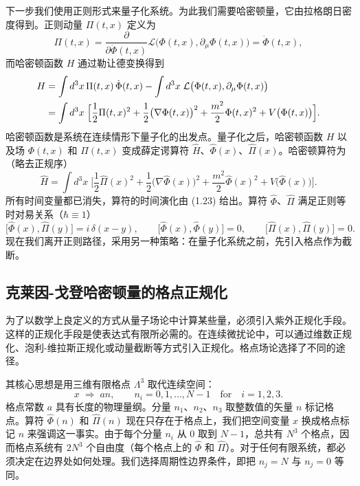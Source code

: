 下一步我们使用正则形式来量子化系统。为此我们需要哈密顿量，它由拉格朗日密度得到。正则动量 $\Pi(t,x)$ 定义为
\begin{equation}
  \Pi(t,x) = \frac{\partial}{\partial\dot{\Phi}(t,x)}
    \mathcal{L}\big(\Phi(t,x), \partial_\mu\Phi(t,x)\big) = \dot{\Phi}(t,x),
\end{equation}
而哈密顿函数 $H$ 通过勒让德变换得到
\begin{align}
  H &= \int d^3x\,\Pi(t,x)\,\dot{\Phi}(t,x)
      - \int d^3x\;\mathcal{L}\big(\Phi(t,x), \partial_\mu\Phi(t,x)\big) \notag\\
    &= \int d^3x\;\Big[\frac{1}{2}\Pi(t,x)^2
       + \frac{1}{2}\big(\nabla\Phi(t,x)\big)^2
       + \frac{m^2}{2}\Phi(t,x)^2 + V\big(\Phi(t,x)\big)\Big].
\end{align}
哈密顿函数是系统在连续情形下量子化的出发点。量子化之后，哈密顿函数 $H$ 以及场 $\Phi(t,x)$ 和 $\Pi(t,x)$ 变成薛定谔算符 $\hat{H}$、$\hat{\Phi}(x)$、$\hat{\Pi}(x)$。哈密顿算符为（略去正规序）
\begin{equation}
  \hat{H} = \int d^3x\;\Big[\frac{1}{2}\hat{\Pi}(x)^2
    + \frac{1}{2}\big(\nabla\hat{\Phi}(x)\big)^2
    + \frac{m^2}{2}\hat{\Phi}(x)^2 + V\big(\hat{\Phi}(x)\big)\Big].
\end{equation}
所有时间变量都已消失，算符的时间演化由 (1.23) 给出。算符 $\hat{\Phi}$、$\hat{\Pi}$ 满足正则等时对易关系（$\hbar \equiv 1$）
\begin{equation}
  \big[\hat{\Phi}(x), \hat{\Pi}(y)\big] = i\,\delta(x-y), \qquad
  \big[\hat{\Phi}(x), \hat{\Phi}(y)\big] = 0, \qquad
  \big[\hat{\Pi}(x), \hat{\Pi}(y)\big] = 0.
\end{equation}
现在我们离开正则路径，采用另一种策略：在量子化系统之前，先引入格点作为截断。

\subsection{克莱因-戈登哈密顿量的格点正规化}

为了以数学上良定义的方式从量子场论中计算某些量，必须引入紫外正规化手段。这样的正规化手段是使表达式有限所必需的。在连续微扰论中，可以通过维数正规化、泡利-维拉斯正规化或动量截断等方式引入正规化。格点场论选择了不同的途径。

其核心思想是用三维有限格点 $\Lambda^3$ 取代连续空间：
\begin{equation}
  x \;\Rightarrow\; an, \qquad n_i = 0, 1, \ldots, N-1
  \quad \text{for} \quad i = 1, 2, 3.
\end{equation}
格点常数 $a$ 具有长度的物理量纲。分量 $n_1$、$n_2$、$n_3$ 取整数值的矢量 $n$ 标记格点。算符 $\hat{\Phi}(n)$ 和 $\hat{\Pi}(n)$ 现在只存在于格点上，我们把空间变量 $x$ 换成格点标记 $n$ 来强调这一事实。由于每个分量 $n_i$ 从 0 取到 $N-1$，总共有 $N^3$ 个格点，因而格点系统有 $2N^3$ 个自由度（每个格点上的 $\hat{\Phi}$ 和 $\hat{\Pi}$）。对于任何有限系统，都必须决定在边界处如何处理。我们选择周期性边界条件，即把 $n_j = N$ 与 $n_j = 0$ 等同。

